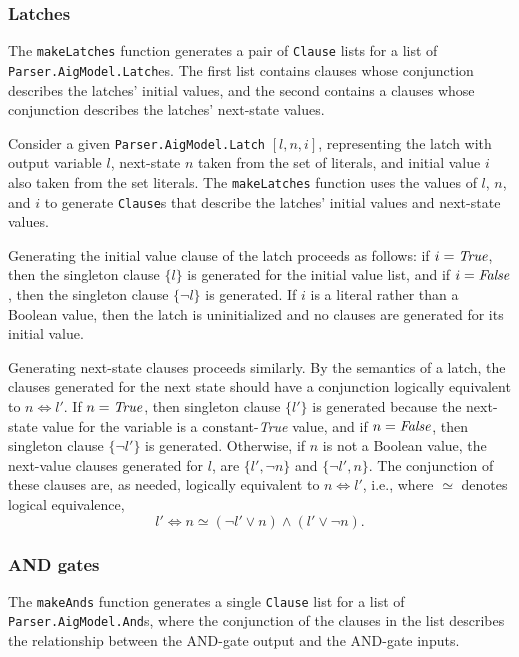 \documentclass[12pt,a4paper,twoside,openright]{report}
\begin{document}
{{\subsubsection{Latches}
The \verb,makeLatches, function generates a pair of \verb,Clause, lists
for a list of \verb,Parser.AigModel.Latch,es. The first list contains
clauses whose conjunction describes the latches' initial values,
and the second contains a clauses whose conjunction describes the
latches' next-state values.

Consider a given \verb,Parser.AigModel.Latch, $[l, n, i]$, representing the latch with
output variable $l$, next-state $n$ taken from the set of literals,
and initial value $i$
also taken from the set literals. The \verb,makeLatches, function uses the
values of $l$, $n$, and $i$ to generate \verb,Clause,s that describe the latches' initial values and
next-state values.

Generating the initial value clause of the latch proceeds as follows: if $i = {\it True}$,
then the singleton clause $\{l\}$ is generated for the initial value list, and if $i = {\it False}$,
then the singleton clause $\{\neg l\}$ is generated.
If $i$ is a literal rather than a Boolean value, then the latch is
uninitialized and no clauses are generated for its initial value.

Generating next-state clauses proceeds similarly.
By the semantics of a latch, the clauses generated for the next state should have
a conjunction logically equivalent to $n \Leftrightarrow l'$.
If $n = {\it True}$, then singleton clause
$\{l'\}$ is generated because the next-state value for the variable is a constant-{\it True} value,
and if $n = {\it False}$, then singleton clause $\{\neg l'\}$ is generated.
Otherwise, if $n$ is not a Boolean value,
the next-value clauses generated for $l$, are $\{l', \neg n\}$
and $\{\neg l', n\}$. The conjunction of these clauses are, as needed, logically equivalent
to $n \Leftrightarrow l'$, i.e., where $\simeq$ denotes logical equivalence,
$$l' \Leftrightarrow n \simeq (\neg l' \vee n) \wedge (l' \vee \neg n).$$

\subsubsection{AND gates}
The \verb,makeAnds, function generates a single \verb,Clause, list for a list of \verb,Parser.AigModel.And,s,
where the conjunction of the clauses in the list describes the relationship between the AND-gate output
and the AND-gate inputs.

}}
\end{document}
